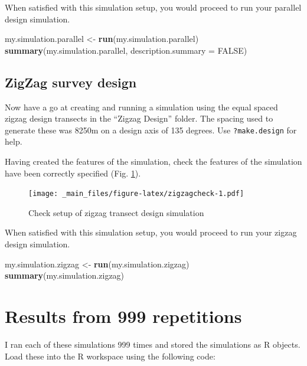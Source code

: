 \documentclass[]{book}
\newenvironment{Shaded}{\begin{snugshade}}{\end{snugshade}}
\newcommand{\KeywordTok}[1]{\textcolor[rgb]{0.13,0.29,0.53}{\textbf{#1}}}
\newcommand{\DataTypeTok}[1]{\textcolor[rgb]{0.13,0.29,0.53}{#1}}
\newcommand{\StringTok}[1]{\textcolor[rgb]{0.31,0.60,0.02}{#1}}
\newcommand{\OtherTok}[1]{\textcolor[rgb]{0.56,0.35,0.01}{#1}}
\newcommand{\NormalTok}[1]{#1}
\theoremstyle{definition}
\theoremstyle{definition}
\theoremstyle{remark}
\begin{document}
When satisfied with this simulation setup, you would proceed to run your
parallel design simulation.

\begin{Shaded}
\begin{Highlighting}[]
\NormalTok{my.simulation.parallel  <-}\StringTok{ }\KeywordTok{run}\NormalTok{(my.simulation.parallel)}
\KeywordTok{summary}\NormalTok{(my.simulation.parallel, }\DataTypeTok{description.summary =} \OtherTok{FALSE}\NormalTok{)}
\end{Highlighting}
\end{Shaded}

\subsection{ZigZag survey design}\label{zigzag-survey-design}

Now have a go at creating and running a simulation using the equal
spaced zigzag design transects in the ``Zigzag Design'' folder. The
spacing used to generate these was 8250m on a design axis of 135
degrees. Use \texttt{?make.design} for help.

Having created the features of the simulation, check the features of the
simulation have been correctly specified (Fig. \ref{fig:zigzagcheck}).

\begin{figure}
\centering
\texttt{[image: \_main\_files/figure-latex/zigzagcheck-1.pdf]}
\caption{\label{fig:zigzagcheck}Check setup of zigzag transect design
simulation}
\end{figure}

When satisfied with this simulation setup, you would proceed to run your
zigzag design simulation.

\begin{Shaded}
\begin{Highlighting}[]
\NormalTok{my.simulation.zigzag  <-}\StringTok{ }\KeywordTok{run}\NormalTok{(my.simulation.zigzag)}
\KeywordTok{summary}\NormalTok{(my.simulation.zigzag)}
\end{Highlighting}
\end{Shaded}

\section{Results from 999
repetitions}\label{results-from-999-repetitions}

I ran each of these simulations 999 times and stored the simulations as
R objects. Load these into the R workspace using the following code:
\end{document}
